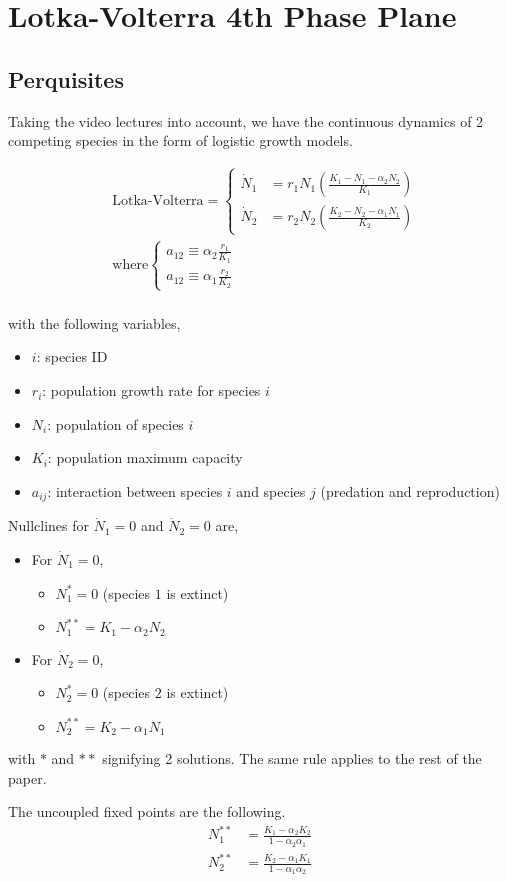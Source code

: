 \section{Lotka-Volterra 4th Phase Plane}
\subsection{Perquisites}
Taking the video lectures into account, we have the continuous dynamics of 2 competing species in the form of logistic growth models.

\begin{equation}
  \begin{split}
    &\text{Lotka-Volterra} =
    \begin{cases}
      \dot N_1 &= r_1 N_1 \left( \frac {K_1 - N_1 - \alpha_2 N_2} {K_1} \right) \\
      \dot N_2 &= r_2 N_2 \left( \frac {K_2 - N_2 - \alpha_1 N_1} {K_2} \right)
    \end{cases} \\
    &\text{where}
    \begin{cases}
      a_{12} \equiv \alpha_2 \frac {r_1} {K_1} \\
      a_{12} \equiv \alpha_1 \frac {r_2} {K_2}
    \end{cases} \\
  \end{split}
\end{equation}

with the following variables,

\begin{itemize}
  \item $i$: species ID
  \item $r_i$: population growth rate for species $i$
  \item $N_i$: population of species $i$
  \item $K_i$: population maximum capacity
  \item $a_{ij}$: interaction between species $i$ and species $j$
  (predation and reproduction)
\end{itemize}

Nullclines for $\dot N_1 = 0$ and $\dot N_2 = 0$ are,
\begin{itemize}
  \item [] For $\dot N_1 = 0$,
  \begin{itemize}
    \item $N_1^* = 0$ (species $1$ is extinct)
    \item $N_1^{**} = K_1 - \alpha_2 N_2$
  \end{itemize}
  \item [] For $\dot N_2 = 0$,
  \begin{itemize}
    \item $N_2^* = 0$ (species $2$ is extinct)
    \item $N_2^{**} = K_2 - \alpha_1 N_1$
  \end{itemize}
\end{itemize}

with $*$ and $**$ signifying 2 solutions. The same rule applies to the rest of the paper.

The uncoupled fixed points are the following.
\begin{align}
  N_1^{**} &= \frac {K_1 - \alpha_2 K_2} {1-\alpha_2 \alpha_1} \\
  N_2^{**} &= \frac {K_2 - \alpha_1 K_1} {1-\alpha_1 \alpha_2}
\end{align}
